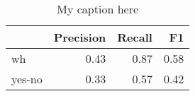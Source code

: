 \begin{table}[!ht]
\centering
\begin{tabular}{lrrr}
\toprule
{} &  Precision &  Recall &   F1 \\
\midrule
wh     &       0.43 &    0.87 & 0.58 \\
yes-no &       0.33 &    0.57 & 0.42 \\
\bottomrule
\end{tabular}
\caption{My caption here}
\label{tab:INTERROGATIVE-ocd-combined-F1}
\end{table}